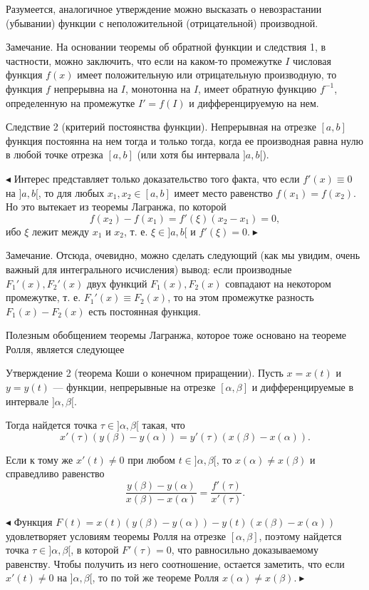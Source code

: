 \documentclass[14pt]{extreport}
\begin{document}
Разумеется, аналогичное утверждение можно высказать о невозрастании (убывании) функции с неположительной (отрицательной) производной. 

Замечание. На основании теоремы об обратной функции и следствия 1, в частности, можно заключить, что если на каком-то промежутке $I$ числовая функция $f(x)$ имеет положительную или отрицательную производную, то функция $f$ непрерывна на $I$, монотонна на $I$, имеет обратную функцию $f^{-1}$, определенную на промежутке $I' = f(I)$ и дифференцируемую на нем.

Следствие 2 (критерий постоянства функции). Непрерывная на отрезке $[a, b]$ функция постоянна на нем тогда и только тогда, когда ее производная
равна нулю в любой точке отрезка $[a, b]$ (или хотя бы интервала $]a, b[$).

$\blacktriangleleft$ Интерес представляет только доказательство того факта, что если $f'(x)\equiv0$ на $]a, b[$, то для любых $x_1, x_2 \in[a, b]$ имеет место равенство $f (x_1)= f (x_2).$ Но это вытекает из теоремы Лагранжа, по которой
\[f (x_2)- f (x_1) = f'(\xi)(x_2 - x_1) = 0,\]
ибо $\xi$ лежит между $x_1$ и $x_2$, т. е. $\xi\in]a, b[$ и $f'(\xi)=0. \blacktriangleright$

Замечание. Отсюда, очевидно, можно сделать следующий (как мы увидим, очень важный для интегрального исчисления) вывод: если производные $F_1'(x), F_2'(x)$ двух функций $F_1(x), F_2(x)$ совпадают на некотором промежутке, т. е. $F_1'(x) \equiv F_2(x)$, то на этом промежутке разность $F_1(x) - F_2(x)$ есть постоянная функция.

Полезным обобщением теоремы Лагранжа, которое тоже основано на теореме Ролля, является следующее

Утверждение 2 (теорема Коши о конечном приращении). Пусть $x = x(t)$ и $y = y(t)$ — функции, непрерывные на отрезке $[\alpha, \beta]$ и дифференцируемые в интервале $]\alpha, \beta[$.

Тогда найдется точка $\tau\in]\alpha, \beta[$ такая, что
\[x'(\tau)( y(\beta)- y(\alpha)) = y'(\tau)(x(\beta)- x(\alpha)).\]

Если к тому же $x'(t) \neq 0$ при любом $t \in]\alpha, \beta[$, то $x(\alpha) \neq x(\beta)$ и справедливо
равенство
\[\frac{y(\beta)- y(\alpha)}{x(\beta)- x(\alpha)}=\frac{f'(\tau)}{x'(\tau)}.\]

$\blacktriangleleft$ Функция $F(t) = x(t)( y(\beta) - y(\alpha)) - y(t)(x(\beta) - x(\alpha))$ удовлетворяет условиям теоремы Ролля на отрезке $[\alpha, \beta]$, поэтому найдется точка $\tau\in]\alpha, \beta[$, в которой $F'(\tau) = 0$, что равносильно доказываемому равенству. Чтобы получить из него соотношение, остается заметить, что если $x'(t) \neq 0$ на $]\alpha, \beta[$, то по той же теореме Ролля $x(\alpha) \neq x(\beta). \blacktriangleright$
\end{document}
